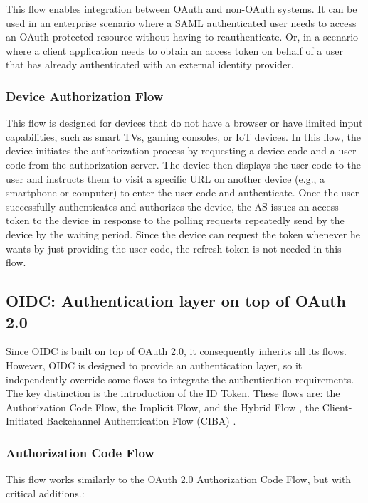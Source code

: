 \documentclass[../memoire.tex]{subfiles}
\begin{document}
This flow enables integration between OAuth and non-OAuth systems. It can be used in an enterprise scenario where a SAML authenticated user needs to access an OAuth protected resource without having to reauthenticate. Or, in a scenario where a client application needs to obtain an access token on behalf of a user that has already authenticated with an external identity provider. 

\subsubsection*{Device Authorization Flow}

This flow is designed for devices that do not have a browser or have limited input capabilities, such as smart TVs, gaming consoles, or IoT devices\cite{rfc8628}. In this flow, the device initiates the authorization process by requesting a device code and a user code from the authorization server. The device then displays the user code to the user and instructs them to visit a specific URL on another device (e.g., a smartphone or computer) to enter the user code and authenticate. Once the user successfully authenticates and authorizes the device, the AS issues an access token to the device in response to the polling requests repeatedly send by the device by the waiting period. Since the device can request the token whenever he wants by just providing the user code, the refresh token is not needed in this flow.

\subsection{OIDC: Authentication layer on top of OAuth 2.0}

Since OIDC is built on top of OAuth 2.0, it consequently inherits all its flows. However, OIDC is designed to provide an authentication layer, so it independently override some flows to integrate the authentication requirements. The key distinction is the introduction of the ID Token. These flows are: the Authorization Code Flow, the Implicit Flow, and the Hybrid Flow \cite[p.~109]{wilson2022}, the Client-Initiated Backchannel Authentication Flow (CIBA) \cite[p.~123]{wilson2022}\cite{ciba}. 

\subsubsection*{Authorization Code Flow}

This flow works similarly to the OAuth 2.0 Authorization Code Flow, but with critical additions\cite{oidc_core}\cite[p.~110]{wilson2022}.:
\end{document}
